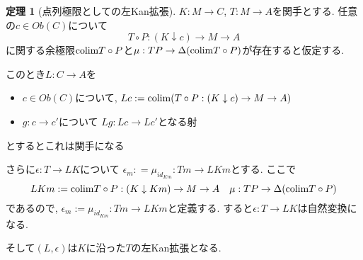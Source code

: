 \documentclass[dvipdfmx,a4paper,11pt]{report}
\newcommand{\colim}{{\rm colim}}
\theoremstyle{definition}
\newtheorem{thm}{定理}
\begin{document}
 \begin{tcolorbox}
 [colback = white, colframe = green!35!black, fonttitle = \bfseries,breakable = true]
\begin{thm}[点列極限としての左Kan拡張]
\label{thm-leftKan-extension}
$K : M \to C$, $T : M \to A$を関手とする.
任意の$c \in Ob(C)$について
$$
T \circ P : (K \downarrow c ) \to M \to A
$$
に関する余極限$\colim T\circ P$と$\mu:  TP \to \Delta (\colim T\circ P)$が存在すると仮定する.

このとき$L : C \to A$を
\begin{itemize}
\item $c \in Ob(C)$について, $Lc : = \colim (T \circ P : (K \downarrow c ) \to M \to A)$
\item $g : c \to c'$について $Lg : Lc \to Lc'$となる射
\end{itemize}
とするとこれは関手になる

さらに$\epsilon : T \to LK $について
$\epsilon_{m}: = \mu_{ id_{Km}}:  Tm \to LKm$とする.
ここで
$$
LKm := \colim T \circ P : (K \downarrow Km ) \to M \to A
\quad
\mu: TP \to\Delta (\colim T\circ P)
$$
であるので, 
$\epsilon_{m} := \mu_{ id_{Km}} : Tm \to LKm $と定義する.
すると$\epsilon : T \to LK $は自然変換になる.

そして$(L,\epsilon)$は$K$に沿った$T$の左Kan拡張となる. 
\end{thm}
\end{tcolorbox}
\end{document}
